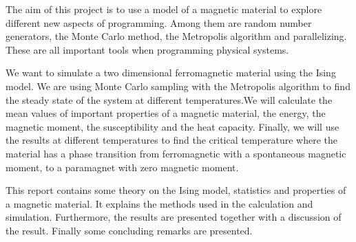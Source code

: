 The aim of this project is to use a model of a magnetic material to explore different new aspects of programming. Among them are random number generators, the Monte Carlo method, the Metropolis algorithm and parallelizing. These are all important tools when programming physical systems.

We want to simulate a two dimensional ferromagnetic material using the Ising model. We are using Monte Carlo sampling with the Metropolis algorithm to find the steady state of the system at different temperatures.We will calculate the mean values of important properties of a magnetic material, the energy, the magnetic moment, the susceptibility and the heat capacity. Finally, we will use the results at different temperatures to find the critical temperature where the material has a phase transition from ferromagnetic with a spontaneous magnetic moment, to a paramagnet with zero magnetic moment. 

This report contains some theory on the Ising model, statistics and properties of a magnetic material. It explains the methods used in the calculation and simulation. Furthermore, the results are presented together with a discussion of the result. Finally some concluding remarks are presented. 